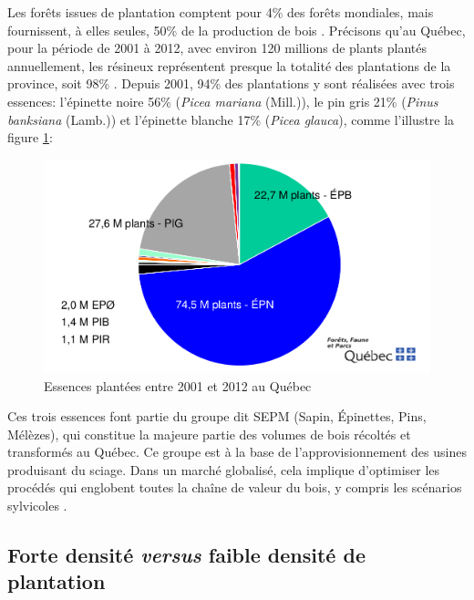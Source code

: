 \documentclass[letterpaper, 12pt]{article}
\begin{document}
\begin{onehalfspace}

Les forêts issues de plantation comptent pour 4\% des forêts mondiales, mais fournissent, à elles seules, 50\% de la production de bois \cite{Miller2009}. Précisons qu'au Québec, pour la période de 2001 à 2012, avec environ 120 millions de plants plantés annuellement, les résineux représentent presque la totalité des plantations de la province, soit 98\% \cite{Richard2015}. Depuis 2001, 94\% des plantations y sont réalisées avec trois essences: l'épinette noire 56\% (\textit{Picea mariana} (Mill.)), le pin gris 21\% (\textit{Pinus banksiana} (Lamb.)) et l'épinette blanche 17\% (\textit{Picea glauca}), comme l'illustre la figure \ref{proportion}:

\vspace{12pt}

\begin{figure}[h]
	\centering
	\includegraphics[width=12cm]{Essencesplantees}
	\caption{Essences plantées entre 2001 et 2012 au Québec}
	\label{proportion}
\end{figure}


Ces trois essences font partie du groupe dit SEPM (Sapin, Épinettes, Pins, Mélèzes), qui constitue la  majeure  partie  des  volumes  de  bois  récoltés et transformés au Québec. Ce groupe est à la base de l’approvisionnement des usines produisant du sciage\cite{Gouv2017}. Dans un marché globalisé, cela implique d'optimiser les procédés qui englobent toutes la chaîne de valeur du bois, y compris les scénarios sylvicoles \cite{Gaudreault2010}. 

\subsection{Forte densité \textit{versus} faible densité de plantation}


\end{onehalfspace}
\end{document}
